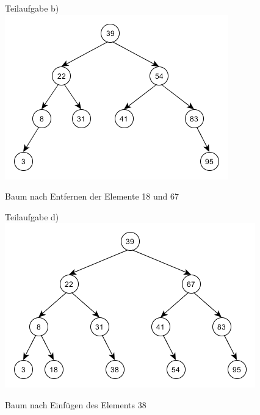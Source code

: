 \documentclass[12pt]{scrartcl}
\begin{document}
\newpage

\begin{figure}[h!]
\begin{center}
Teilaufgabe b)
\includegraphics[scale=0.8]{Aufgabe2b)B3.png}
\caption{Baum nach Entfernen der Elemente 18 und 67}
\end{center}
\end{figure}

\begin{figure}[h!]
\begin{center}
Teilaufgabe d)
\includegraphics[scale=0.8]{Aufgabe2d)B4.png}
\caption{Baum nach Einfügen des Elements 38}
\end{center}
\end{figure}

\newpage
\end{document}
